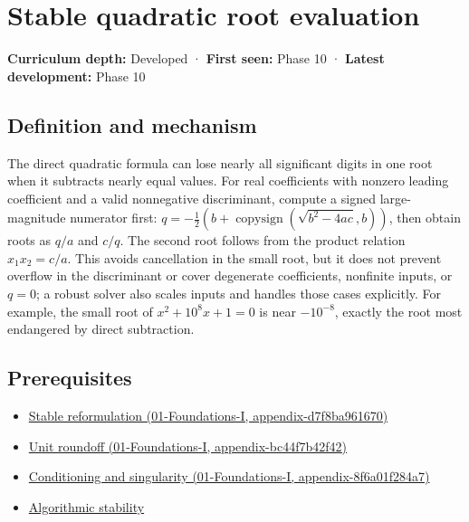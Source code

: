 \hypertarget{appendix-b9afba7f63e5}{}
\section{Stable quadratic root evaluation}\label{appendix-b9afba7f63e5-stable-quadratic-root-evaluation}

\textbf{Curriculum depth:} Developed · \textbf{First seen:} Phase 10 · \textbf{Latest development:} Phase 10

\subsection{Definition and mechanism}\label{appendix-b9afba7f63e5-definition-and-mechanism}

The direct quadratic formula can lose nearly all significant digits in one root when it subtracts nearly equal values. For real coefficients with nonzero leading coefficient and a valid nonnegative discriminant, compute a signed large-magnitude numerator first: \(q=-\frac12(b+\operatorname{copysign}(\sqrt{b^2-4ac},b))\), then obtain roots as \(q/a\) and \(c/q\). The second root follows from the product relation \(x_1x_2=c/a\). This avoids cancellation in the small root, but it does not prevent overflow in the discriminant or cover degenerate coefficients, nonfinite inputs, or \(q=0\); a robust solver also scales inputs and handles those cases explicitly. For example, the small root of \(x^2+10^8x+1=0\) is near \(-10^{-8}\), exactly the root most endangered by direct subtraction.

\subsection{Prerequisites}\label{appendix-b9afba7f63e5-prerequisites}

\begin{itemize}
\tightlist
\item
  \href{../01-Foundations-I/main.pdf\#nameddest=appendix-d7f8ba961670}{Stable reformulation (01-Foundations-I, appendix-d7f8ba961670)}
\item
  \href{../01-Foundations-I/main.pdf\#nameddest=appendix-bc44f7b42f42}{Unit roundoff (01-Foundations-I, appendix-bc44f7b42f42)}
\item
  \href{../01-Foundations-I/main.pdf\#nameddest=appendix-8f6a01f284a7}{Conditioning and singularity (01-Foundations-I, appendix-8f6a01f284a7)}
\item
  \hyperref[appendix-aa2bf0d79639]{Algorithmic stability}
\end{itemize}


